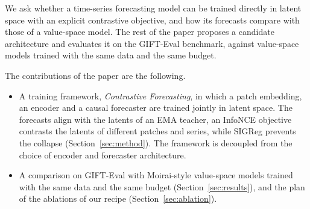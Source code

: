 We ask whether a time-series forecasting model can be trained
directly in latent space with an explicit contrastive objective, and
how its forecasts compare with those of a value-space model. The rest
of the paper proposes a candidate architecture and evaluates it on
the GIFT-Eval benchmark, against value-space models trained with the
same data and the same budget.

The contributions of the paper are the following.
\begin{itemize}
\item A training framework, \emph{Contrastive Forecasting}, in which
  a patch embedding, an encoder and a causal forecaster are trained
  jointly in latent space. The forecasts align with the latents of an
  EMA teacher, an InfoNCE objective contrasts the latents of different
  patches and series, while SIGReg prevents the collapse
  (Section~\ref{sec:method}). The framework is decoupled from the
  choice of encoder and forecaster architecture.
\item A comparison on GIFT-Eval with Moirai-style value-space models
  trained with the same data and the same budget
  (Section~\ref{sec:results}), and the plan of the ablations of
  our recipe (Section~\ref{sec:ablation}).
\end{itemize}
